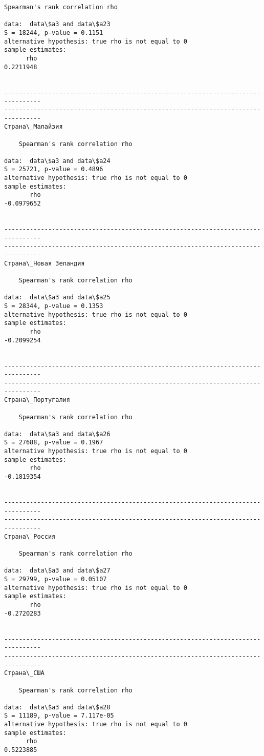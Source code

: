 \documentclass[11pt,mathletters]{article}
\begin{document}
\begin{Verbatim}[commandchars=\\\{\}]
	Spearman's rank correlation rho

data:  data\$a3 and data\$a23
S = 18244, p-value = 0.1151
alternative hypothesis: true rho is not equal to 0
sample estimates:
      rho 
0.2211948 


--------------------------------------------------------------------------------
--------------------------------------------------------------------------------
Страна\_Малайзия

	Spearman's rank correlation rho

data:  data\$a3 and data\$a24
S = 25721, p-value = 0.4896
alternative hypothesis: true rho is not equal to 0
sample estimates:
       rho 
-0.0979652 


--------------------------------------------------------------------------------
--------------------------------------------------------------------------------
Страна\_Новая Зеландия 

	Spearman's rank correlation rho

data:  data\$a3 and data\$a25
S = 28344, p-value = 0.1353
alternative hypothesis: true rho is not equal to 0
sample estimates:
       rho 
-0.2099254 


--------------------------------------------------------------------------------
--------------------------------------------------------------------------------
Страна\_Португалия

	Spearman's rank correlation rho

data:  data\$a3 and data\$a26
S = 27688, p-value = 0.1967
alternative hypothesis: true rho is not equal to 0
sample estimates:
       rho 
-0.1819354 


--------------------------------------------------------------------------------
--------------------------------------------------------------------------------
Страна\_Россия

	Spearman's rank correlation rho

data:  data\$a3 and data\$a27
S = 29799, p-value = 0.05107
alternative hypothesis: true rho is not equal to 0
sample estimates:
       rho 
-0.2720283 


--------------------------------------------------------------------------------
--------------------------------------------------------------------------------
Страна\_США

	Spearman's rank correlation rho

data:  data\$a3 and data\$a28
S = 11189, p-value = 7.117e-05
alternative hypothesis: true rho is not equal to 0
sample estimates:
      rho 
0.5223885 



\end{Verbatim}
\end{document}
